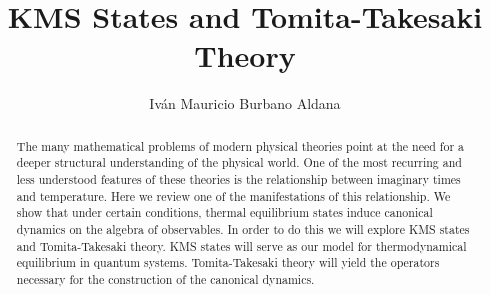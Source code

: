 \documentclass{article}
\title{KMS States and Tomita-Takesaki Theory}
\author{Iván Mauricio Burbano Aldana}
\begin{document}
\maketitle

\begin{abstract}

The many mathematical problems of modern physical theories point at the need for a deeper structural understanding of the physical world. One of the most recurring and less understood features of these theories is the relationship between imaginary times and temperature. Here we review one of the manifestations of this relationship. We show that under certain conditions, thermal equilibrium states induce canonical dynamics on the algebra of observables. In order to do this we will explore KMS states and Tomita-Takesaki theory. KMS states will serve as our model for thermodynamical equilibrium in quantum systems. Tomita-Takesaki theory will yield the operators necessary for the construction of the canonical dynamics.

\end{abstract}
\end{document}
